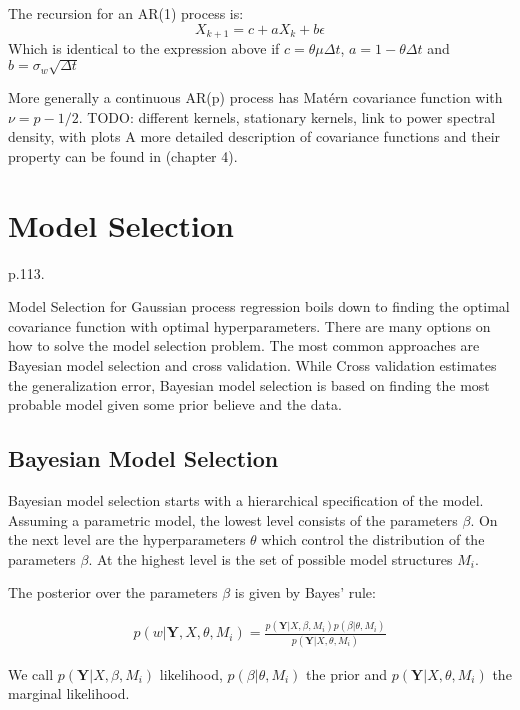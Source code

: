 The recursion for an AR(1) process is:
$$ X_{k+1} = c + a X_k + b \epsilon$$
Which is identical to the expression above if $c= \theta \mu \Delta t$, $a=1- \theta \Delta t$ and
$b= \sigma_w \sqrt{\Delta t}$



More generally a continuous AR(p) process has Matérn covariance function with $\nu = p - 1/2$.
TODO: different kernels, stationary kernels, link to power spectral density, with plots
A more detailed description of covariance functions and their property can be found
in \citeauthor{rasmussen_gaussian_2006} (chapter 4).



\section{Model Selection}
\citeauthor{rasmussen_gaussian_2006} p.113.

Model Selection for Gaussian process regression boils down to finding the optimal
covariance function with optimal hyperparameters.
There are many options on how to solve the model selection problem.
The most common approaches are Bayesian model selection and cross validation.
While Cross validation estimates the generalization error,
Bayesian model selection is based on finding the most probable model given some prior believe and the data.

\subsection{Bayesian Model Selection}

Bayesian model selection starts with a hierarchical specification of the model.
Assuming a parametric model, the lowest level consists of the parameters $\beta$.
On the next level are the hyperparameters $\theta$ which control the distribution of the
parameters $\beta$.
At the highest level is the set of possible model structures $M_i$.

The posterior over the parameters $\beta$ is given by Bayes' rule:

\begin{gather*}
    p(w | \mathbf{Y}, X, \theta, M_i) = \frac{p( \mathbf{Y}| X, \beta,
        M_i)p(\beta|\theta, M_i)}{p(\mathbf{Y}|X, \theta, M_i)}
\end{gather*}

We call $p(\mathbf{Y}| X, \beta, M_i)$ likelihood,
$p(\beta|\theta, M_i)$ the prior
and $p(\mathbf{Y}|X, \theta, M_i)$ the marginal likelihood.


